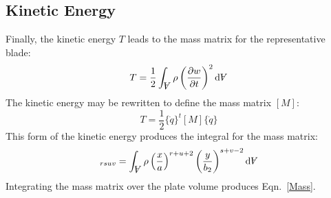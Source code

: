 \documentclass[thesis]{fputhesis}
\newcommand{\Vol}{\rotatebox[origin=c]{180}{\ensuremath{A}}}
\begin{document}
\begin{body}
\begin{appendices}
\subsection{Kinetic Energy}
Finally, the kinetic energy $T$ leads to the mass matrix for the representative blade:
\begin{equation}
T=\frac{1}{2} \int_{\Vol} \rho \left(\frac{\partial w}{\partial t}\right)^2 \text{d}\Vol
\end{equation}
The kinetic energy may be rewritten to define the mass matrix $[M]$:
\begin{equation}
T=\frac{1}{2}\{\dot{q}\}^t[M]\{\dot{q}\}
\end{equation}
This form of the kinetic energy produces the integral for the mass matrix:
\begin{equation}
[M]_{rsuv}=\int_{\Vol} \rho \left(\frac{x}{a}\right)^{r+u+2}\left(\frac{y}{b_2}\right)^{s+v-2} \text{d}\Vol
\end{equation}
Integrating the mass matrix over the plate volume produces Eqn.~\eqref{Mass}.


\end{appendices}
\end{body}
\end{document}
